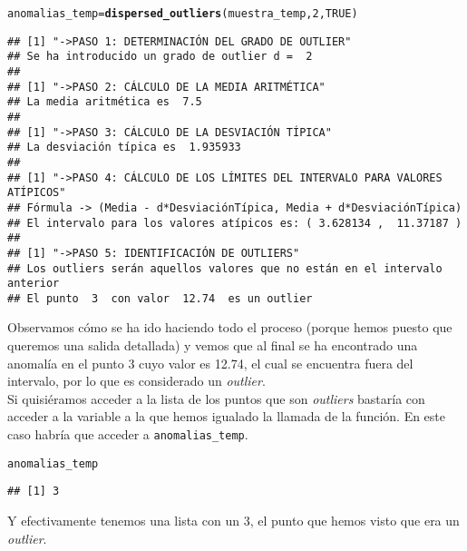\documentclass[12pt]{report}\usepackage[]{graphicx}\usepackage[dvipsnames]{xcolor}
\makeatletter
\newcommand{\hlnum}[1]{\textcolor[rgb]{0.686,0.059,0.569}{#1}}%
\newcommand{\hlstd}[1]{\textcolor[rgb]{0.345,0.345,0.345}{#1}}%
\newcommand{\hlkwb}[1]{\textcolor[rgb]{0.69,0.353,0.396}{#1}}%
\newcommand{\hlkwd}[1]{\textcolor[rgb]{0.737,0.353,0.396}{\textbf{#1}}}%
\newenvironment{kframe}{%
 \def\at@end@of@kframe{}%
 \ifinner\ifhmode%
  \def\at@end@of@kframe{\end{minipage}}%
  \begin{minipage}{\columnwidth}%
 \fi\fi%
 \def\FrameCommand##1{\hskip\@totalleftmargin \hskip-\fboxsep
 \colorbox{shadecolor}{##1}\hskip-\fboxsep
     \hskip-\linewidth \hskip-\@totalleftmargin \hskip\columnwidth}%
 \MakeFramed {\advance\hsize-\width
   \@totalleftmargin\z@ \linewidth\hsize
   \@setminipage}}%
 {\par\unskip\endMakeFramed%
 \at@end@of@kframe}
\newenvironment{knitrout}{}{} %
\makeatother
\begin{document}
\begin{knitrout}
\color{fgcolor}\begin{kframe}
\begin{alltt}
\hlstd{anomalias_temp} \hlkwb{=} \hlkwd{dispersed_outliers}\hlstd{(muestra_temp,}\hlnum{2}\hlstd{,}\hlnum{TRUE}\hlstd{)}
\end{alltt}
\begin{verbatim}
## [1] "->PASO 1: DETERMINACIÓN DEL GRADO DE OUTLIER"
## Se ha introducido un grado de outlier d =  2 
## 
## [1] "->PASO 2: CÁLCULO DE LA MEDIA ARITMÉTICA"
## La media aritmética es  7.5 
## 
## [1] "->PASO 3: CÁLCULO DE LA DESVIACIÓN TÍPICA"
## La desviación típica es  1.935933 
## 
## [1] "->PASO 4: CÁLCULO DE LOS LÍMITES DEL INTERVALO PARA VALORES ATÍPICOS"
## Fórmula -> (Media - d*DesviaciónTípica, Media + d*DesviaciónTípica)
## El intervalo para los valores atípicos es: ( 3.628134 ,  11.37187 )
## 
## [1] "->PASO 5: IDENTIFICACIÓN DE OUTLIERS"
## Los outliers serán aquellos valores que no están en el intervalo anterior
## El punto  3  con valor  12.74  es un outlier
\end{verbatim}
\end{kframe}
\end{knitrout}
					
					Observamos cómo se ha ido haciendo todo el proceso (porque hemos puesto que queremos una salida detallada) y vemos que al final se ha encontrado una anomalía en el punto 3 cuyo valor es 12.74, el cual se encuentra fuera del intervalo, por lo que es considerado un \textit{outlier}.\\
					
					Si quisiéramos acceder a la lista de los puntos que son \textit{outliers} bastaría con acceder a la variable a la que hemos igualado la llamada de la función. En este caso habría que acceder a \texttt{anomalias\_temp}.
					
\begin{knitrout}
\color{fgcolor}\begin{kframe}
\begin{alltt}
\hlstd{anomalias_temp}
\end{alltt}
\begin{verbatim}
## [1] 3
\end{verbatim}
\end{kframe}
\end{knitrout}
					
					Y efectivamente tenemos una lista con un 3, el punto que hemos visto que era un \textit{outlier}.\\
					
\end{document}
